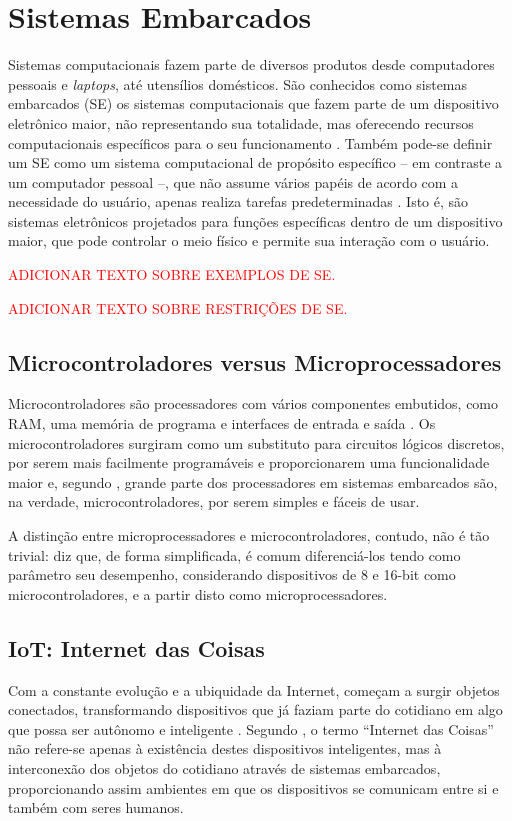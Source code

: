 \section{Sistemas Embarcados}
\label{sec:embarcados}
Sistemas computacionais fazem parte de diversos produtos desde computadores pessoais e \textit{laptops}, até utensílios domésticos. São conhecidos como sistemas embarcados (SE) os sistemas computacionais que fazem parte de um dispositivo eletrônico maior, não representando sua totalidade, mas oferecendo recursos computacionais específicos para o seu funcionamento \cite{vahid:2002}. Também pode-se definir um SE como um sistema computacional de propósito específico -- em contraste a um computador pessoal --, que não assume vários papéis de acordo com a necessidade do usuário, apenas realiza tarefas predeterminadas \cite{heath:2002}. Isto é, são sistemas eletrônicos projetados para funções específicas dentro de um dispositivo maior, que pode controlar o meio físico e permite sua interação com o usuário.

\textcolor{red}{ADICIONAR TEXTO SOBRE EXEMPLOS DE SE.}

\textcolor{red}{ADICIONAR TEXTO SOBRE RESTRIÇÕES DE SE.}

\subsection{Microcontroladores versus Microprocessadores}
Microcontroladores são processadores com vários componentes embutidos, como RAM, uma memória de programa e interfaces de entrada e saída \cite{white:2011}. Os microcontroladores surgiram como um substituto para circuitos lógicos discretos, por serem mais facilmente programáveis e proporcionarem uma funcionalidade maior \cite{heath:2002} e, segundo , grande parte dos processadores em sistemas embarcados são, na verdade, microcontroladores, por serem simples e fáceis de usar.

A distinção entre microprocessadores e microcontroladores, contudo, não é tão trivial:  diz que, de forma simplificada, é comum diferenciá-los tendo como parâmetro seu desempenho, considerando dispositivos de 8 e 16-bit como microcontroladores, e a partir disto como microprocessadores.

\subsection{IoT: Internet das Coisas}
Com a constante evolução e a ubiquidade da Internet, começam a surgir objetos conectados, transformando dispositivos que já faziam parte do cotidiano em algo que possa ser autônomo e inteligente \cite{kopetz:2011}.  Segundo , o termo ``Internet das Coisas''  não refere-se apenas à existência destes dispositivos inteligentes, mas à interconexão dos objetos do cotidiano através de sistemas embarcados, proporcionando assim ambientes em que os dispositivos se comunicam entre si e também com seres humanos.


